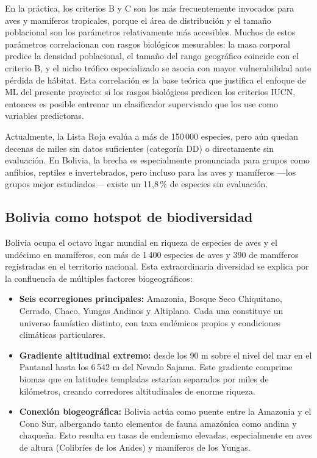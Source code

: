 \documentclass[12pt,a4paper]{article}
\begin{document}
En la práctica, los criterios B y C son los más frecuentemente invocados para aves y mamíferos
tropicales, porque el área de distribución y el tamaño poblacional son los parámetros
relativamente más accesibles.
Muchos de estos parámetros correlacionan con rasgos biológicos mesurables: la masa corporal
predice la densidad poblacional, el tamaño del rango geográfico coincide con el criterio B,
y el nicho trófico especializado se asocia con mayor vulnerabilidad ante pérdida de hábitat.
Esta correlación es la base teórica que justifica el enfoque de ML del presente proyecto:
si los rasgos biológicos predicen los criterios IUCN, entonces es posible entrenar un
clasificador supervisado que los use como variables predictoras.

Actualmente, la Lista Roja evalúa a más de 150\,000 especies, pero aún quedan decenas de
miles sin datos suficientes (categoría DD) o directamente sin evaluación.
En Bolivia, la brecha es especialmente pronunciada para grupos como anfibios, reptiles
e invertebrados, pero incluso para las aves y mamíferos ---los grupos mejor estudiados---
existe un 11,8\,\% de especies sin evaluación.

\subsection{Bolivia como hotspot de biodiversidad}

Bolivia ocupa el octavo lugar mundial en riqueza de especies de aves y el undécimo en mamíferos,
con más de 1\,400 especies de aves y 390 de mamíferos registradas en el territorio nacional.
Esta extraordinaria diversidad se explica por la confluencia de múltiples factores biogeográficos:

\begin{itemize}
  \item \textbf{Seis ecorregiones principales:} Amazonia, Bosque Seco Chiquitano, Cerrado,
        Chaco, Yungas Andinos y Altiplano.  Cada una constituye un universo faunístico distinto,
        con taxa endémicos propios y condiciones climáticas particulares.
  \item \textbf{Gradiente altitudinal extremo:} desde los 90 m sobre el nivel del mar en el
        Pantanal hasta los 6\,542 m del Nevado Sajama.  Este gradiente comprime biomas que en
        latitudes templadas estarían separados por miles de kilómetros, creando corredores
        altitudinales de enorme riqueza.
  \item \textbf{Conexión biogeográfica:} Bolivia actúa como puente entre la Amazonia y el
        Cono Sur, albergando tanto elementos de fauna amazónica como andina y chaqueña.
        Esto resulta en tasas de endemismo elevadas, especialmente en aves de altura (Colibríes
        de los Andes) y mamíferos de los Yungas.
\end{itemize}
\end{document}
